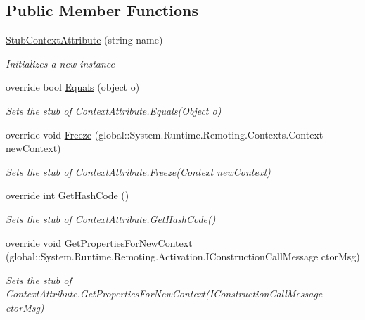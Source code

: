 \subsection*{Public Member Functions}
\begin{DoxyCompactItemize}
\item 
\hyperlink{class_system_1_1_runtime_1_1_remoting_1_1_contexts_1_1_fakes_1_1_stub_context_attribute_a0fd5c82ae9234a79ebd0fd2de9cc2cb1}{Stub\-Context\-Attribute} (string name)
\begin{DoxyCompactList}\small\item\em Initializes a new instance\end{DoxyCompactList}\item 
override bool \hyperlink{class_system_1_1_runtime_1_1_remoting_1_1_contexts_1_1_fakes_1_1_stub_context_attribute_a183fd51c690810b0fa4be0c43b1d6db1}{Equals} (object o)
\begin{DoxyCompactList}\small\item\em Sets the stub of Context\-Attribute.\-Equals(\-Object o)\end{DoxyCompactList}\item 
override void \hyperlink{class_system_1_1_runtime_1_1_remoting_1_1_contexts_1_1_fakes_1_1_stub_context_attribute_a05c86db79f89525e14e48e4b783d126a}{Freeze} (global\-::\-System.\-Runtime.\-Remoting.\-Contexts.\-Context new\-Context)
\begin{DoxyCompactList}\small\item\em Sets the stub of Context\-Attribute.\-Freeze(\-Context new\-Context)\end{DoxyCompactList}\item 
override int \hyperlink{class_system_1_1_runtime_1_1_remoting_1_1_contexts_1_1_fakes_1_1_stub_context_attribute_ac728dea4ea9505888826cee0b43e7982}{Get\-Hash\-Code} ()
\begin{DoxyCompactList}\small\item\em Sets the stub of Context\-Attribute.\-Get\-Hash\-Code()\end{DoxyCompactList}\item 
override void \hyperlink{class_system_1_1_runtime_1_1_remoting_1_1_contexts_1_1_fakes_1_1_stub_context_attribute_aecd2f6700e6f3196e47270156acb2388}{Get\-Properties\-For\-New\-Context} (global\-::\-System.\-Runtime.\-Remoting.\-Activation.\-I\-Construction\-Call\-Message ctor\-Msg)
\begin{DoxyCompactList}\small\item\em Sets the stub of Context\-Attribute.\-Get\-Properties\-For\-New\-Context(\-I\-Construction\-Call\-Message ctor\-Msg)\end{DoxyCompactList}\item 

\end{DoxyCompactItemize}
